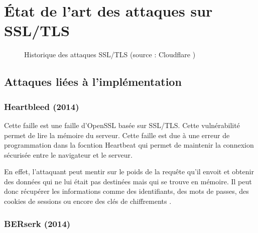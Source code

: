 \chapter{État de l'art des attaques sur SSL/TLS}

\begin{figure}[H]
  \caption{Historique des attaques SSL/TLS (source : Cloudflare \cite{cloudflare})}
\end{figure}

\section{Attaques liées à l'implémentation}

\subsection{Heartbleed (2014)}
Cette faille est une faille d'OpenSSL basée sur SSL/TLS. Cette vulnérabilité permet de lire la mémoire du serveur. Cette faille est due à une erreur de programmation dans la focntion Heartbeat qui permet de maintenir la connexion sécurisée entre le navigateur et le serveur.

En effet, l'attaquant peut mentir sur le poids de la requête qu'il envoit et obtenir des données qui ne lui était pas destinées mais qui se trouve en mémoire. Il peut donc récupérer les informations comme des identifiants, des mots de passes, des cookies de sessions ou encore des clés de chiffrements \cite{heartbleed}.

\subsection{BERserk (2014)}

